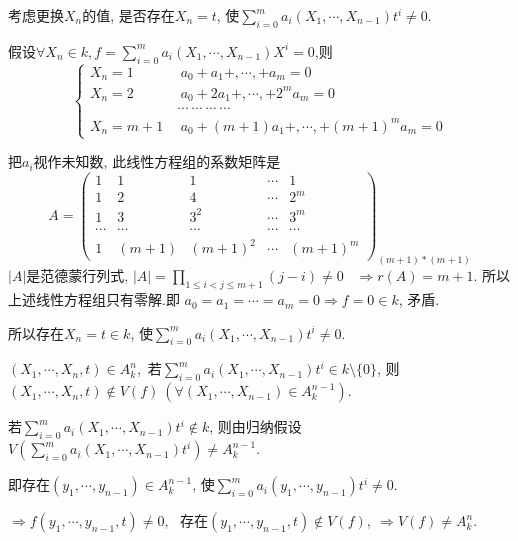 \documentclass[UTF8]{book}
\begin{document}
	考虑更换$X_{n}$的值, 是否存在$X_{n}=t$, 使$\sum\limits_{i=0}^m a_{i}(X_{1}, \cdots , X_{n-1})t^{i}\neq 0$.
	
	假设$\forall X_{n}\in k , f= \sum\limits_{i=0}^m a_{i}(X_{1}, \cdots , X_{n-1})X^{i}=0 $,则
	\begin{equation*}
	\left\{
	\begin{aligned}
	X_{n}=1 \ &\  a_{0}+a_{1}+ ,\cdots ,+a_{m}=0 \\
	X_{n}=2 \ &\  a_{0}+2a_{1}+ ,\cdots ,+2^{m}a_{m}=0\\
	& \cdots \ \cdots  \ \cdots \ \cdots\\
	X_{n}=m+1 \ &\   a_{0}+(m+1)a_{1}+ ,\cdots ,+(m+1)^{m}a_{m}=0
	\end{aligned}
	\right.
	\end{equation*}
	
	把$a_{i}$视作未知数, 此线性方程组的系数矩阵是
	\begin{equation*}
	A=\begin{pmatrix}
	1 & 1 & 1 & \cdots & 1 \\
	1 & 2 & 4 & \cdots & 2^{m} \\
	1 & 3 & 3^{2} & \cdots & 3^{m} \\
	\cdots& \cdots & \cdots & \cdots & \cdots \\
	1 & (m+1) & (m+1)^{2} & \cdots & (m+1)^{m}
	\end{pmatrix}_{(m+1)*(m+1)}
	\end{equation*}
	$\vert A\vert $是范德蒙行列式, $\vert A\vert=\prod_{1\leq i<j \leq m+1}(j-i) \neq 0$ \ $\Rightarrow r(A)=m+1$. 所以上述线性方程组只有零解.即 $a_{0}=a_{1}= \cdots =a_{m}=0  \Rightarrow f=0 \in k $, 矛盾.
	
	所以存在$X_{n}=t \in k$, 使$\sum\limits_{i=0}^m a_{i}(X_{1}, \cdots , X_{n-1})t^{i}\neq 0$.
	
	$(X_{1}, \cdots , X_{n}, t)\in A^{n}_{k}$,\ 若$\sum\limits_{i=0}^m a_{i}(X_{1}, \cdots , X_{n-1})t^{i}\in k\setminus \{0\}$, 则
	$(X_{1}, \cdots , X_{n}, t)\notin V(f) \ (\forall (X_{1}, \cdots , X_{n-1})\in A^{n-1}_{k}).$
	
	若$\sum\limits_{i=0}^m a_{i}(X_{1}, \cdots , X_{n-1})t^{i}\notin k$, 则由归纳假设$V(\sum\limits_{i=0}^m a_{i}(X_{1}, \cdots , X_{n-1})t^{i})\neq A^{n-1}_{k}$.
	
	即存在$(y_{1}, \cdots , y_{n-1})\in A^{n-1}_{k}$, 使$\sum\limits_{i=0}^m a_{i}(y_{1}, \cdots , y_{n-1})t^{i}\neq 0$.
	
	$\Rightarrow f(y_{1}, \cdots , y_{n-1},t)\neq 0$, \ 存在$(y_{1}, \cdots , y_{n-1},t)\notin V(f), \ \Rightarrow V(f)\neq A^{n}_{k}.$
				
\end{document}
